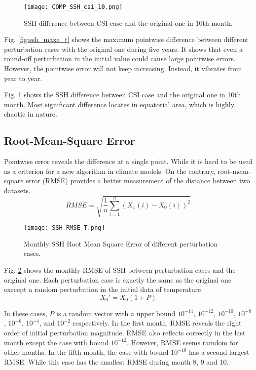 \documentclass{sig-alternate}
\begin{document}
\begin{figure}
\begin{center}
\texttt{[image: COMP\_SSH\_csi\_10.png]}
\end{center}
\caption[] {SSH difference between CSI case and the original one in 10th month.}
\label{fig:ssh_comp_csi_10}
\end{figure}

Fig. \ref{fig:ssh_maxe_t} shows the maximum pointwise difference between different perturbation cases with the original one during five years.  It shows that even a round-off perturbation in the initial value could cause large pointwise errors. However, the pointwise error will not keep increasing. Instead, it vibrates from year to year. 

Fig. \ref{fig:ssh_comp_csi_10} shows the SSH difference between CSI case and the original one in 10th month. Most significant difference locates in equatorial area, which is highly chaotic in nature. 

\subsection{Root-Mean-Square Error}
Pointwise error reveals the difference at a single point. While it is hard to be used as a criterion for a new algorithm in climate models. On the contrary, root-mean-square error (RMSE) provides a better measurement of the distance between two datasets. 
$$RMSE = \sqrt{\frac{1}{n}\sum_{i=1}^n(X_1(i)-X_0(i))^2}$$


\begin{figure}
\begin{center}
\texttt{[image: SSH\_RMSE\_T.png]}
\end{center}
\caption[] {Monthly SSH Root Mean Square Error of different perturbation cases.}
\label{fig:ssh_rmse_p}
\end{figure}



Fig. \ref{fig:ssh_rmse_p} shows the monthly RMSE of SSH between perturbation cases and the original one. Each perturbation case is exactly the same as the original one execept a random perturbation in the initial data of temperature
$$X_0' =X_0(1+P)$$

In these cases, $P$ is a random vector with a upper bound $10^{-14}$, $10^{-12}$, $10^{-10}$, $10^{-8}$, $10^{-6}$, $10^{-4}$, and $10^{-2}$ respectively.
In the first month, RMSE reveals the right order of initial perturbation magnitude. RMSE also reflects correctly in the last month except the case with bound $10^{-12}$. However, RMSE seems ramdom for other months. In the fifth month, the case with bound $10^{-10}$ has a second largest RMSE. While this case has the smallest RMSE during month 8, 9 and 10. 
\end{document}
